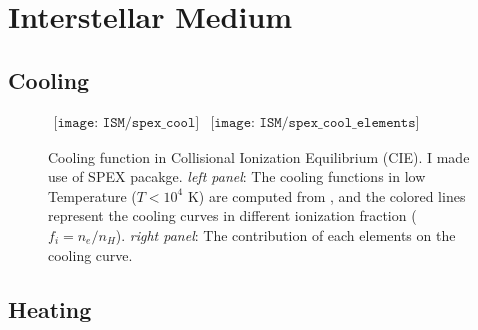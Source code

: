 \chapter{Interstellar Medium}
\section{Cooling}

\begin{figure}[!htbp] 
   \begin{center}$ 
    \begin{array}{cc} 
      \texttt{[image: ISM/spex\_cool]} &  
      \texttt{[image: ISM/spex\_cool\_elements]}    
    \end{array}$ 
   \end{center} 
    \caption{Cooling function in Collisional Ionization Equilibrium (CIE). I made use of SPEX pacakge\cite{Schure:09}. {\it left panel}: The cooling functions in low Temperature ($T < 10^{4}$ K) are computed from \cite{Dalgarno:72}, and the colored lines represent the cooling curves in different ionization fraction ($f_{i}=n_{e}/n_{H}$). {\it right panel}: The contribution of each elements on the cooling curve.} 
   \label{fig:spexCool} 
\end{figure}

\bigskip
\section{Heating}

%
%
